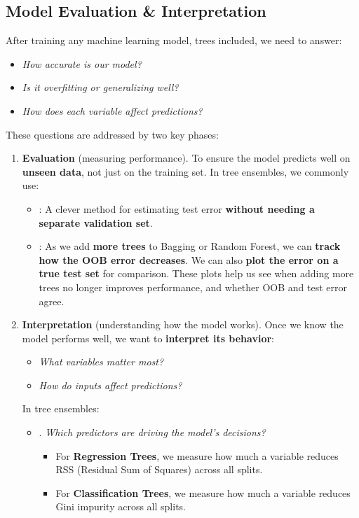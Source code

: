 \subsection{Model Evaluation \& Interpretation}

After training any machine learning model, trees included, we need to answer:
\begin{itemize}
    \item \emph{How accurate is our model?}
    \item \emph{Is it overfitting or generalizing well?}
    \item \emph{How does each variable affect predictions?}
\end{itemize}
These questions are addressed by two key phases:
\begin{enumerate}
    \item \textbf{Evaluation} (measuring performance). To ensure the model predicts well on \textbf{unseen data}, not just on the training set. In tree ensembles, we commonly use:
    \begin{itemize}
        \item {}: A clever method for estimating test error \textbf{without needing a separate validation set}.
        \item {}: As we add \textbf{more trees} to Bagging or Random Forest, we can \textbf{track how the OOB error decreases}. We can also \textbf{plot the error on a true test set} for comparison. These plots help us see when adding more trees no longer improves performance, and whether OOB and test error agree.
    \end{itemize}


    \item \textbf{Interpretation} (understanding how the model works). Once we know the model performs well, we want to \textbf{interpret its behavior}:
    \begin{itemize}
        \item \emph{What variables matter most?}
        \item \emph{How do inputs affect predictions?}
    \end{itemize}
    In tree ensembles:
    \begin{itemize}
        \item {}. \emph{Which predictors are driving the model's decisions?}
        \begin{itemize}
            \item For \textbf{Regression Trees}, we measure how much a variable reduces RSS (Residual Sum of Squares) across all splits.
            \item For \textbf{Classification Trees}, we measure how much a variable reduces Gini impurity across all splits.
        \end{itemize}


\end{itemize}
\end{enumerate}
